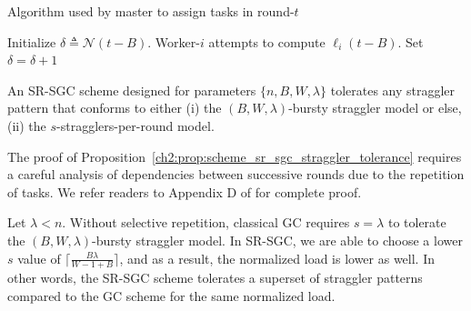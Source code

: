 

\begin{algorithm}[H]
    \caption{Algorithm used by master to assign tasks in round-$t$}
    \label{ch2:alg:constr_sr_sgc}	
    \begin{algorithmic}
        \State Initialize $\delta\triangleq\mathcal{N}(t-B)$.
        \State Worker-$i$ attempts to compute $\ell_i(t-B)$.
        \State Set $\delta=\delta+1$
        \Else
        \EndIf
        \EndFor
    \end{algorithmic}	
\end{algorithm}


\begin{prop}\label{ch2:prop:scheme_sr_sgc_straggler_tolerance}
    An SR-SGC scheme designed for parameters  $\{n, B, W, \lambda\}$ tolerates any straggler pattern that conforms to either (i) the $(B, W, \lambda)$-bursty straggler model or else, (ii) the $s$-stragglers-per-round model.
\end{prop}

The proof of Proposition~\ref{ch2:prop:scheme_sr_sgc_straggler_tolerance} requires a careful analysis of dependencies between successive rounds due to the repetition of tasks. We refer readers to Appendix D of \cite{krishnan2023sequential} for complete proof.

\begin{remark}\normalfont
    Let $\lambda<n$. Without selective repetition, classical GC requires $s=\lambda$ to tolerate the $(B,W,\lambda)$-bursty straggler model. In SR-SGC, we are able to choose a lower $s$ value of $\lceil\frac{B\lambda}{W-1+B}\rceil$, and as a result, the normalized load is lower as well. In other words, the SR-SGC scheme tolerates a superset of straggler patterns compared to the GC scheme for the same normalized load.
\end{remark}

